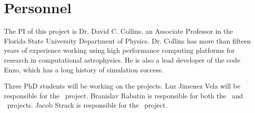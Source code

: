 
\section{Personnel}

The PI of this project is Dr. David C. Collins, an Associate Professor in the
Florida State University Department of Physics.  Dr. Collins has more than
fifteen years of experience working using high performance computing platforms
for research  in computational astrophysics.   He is also a
lead developer of the code Enzo, which has a long history of simulation
success.

Three PhD students will be working on the projects.  Luz Jimenez Vela will
be responsible for the \nameCores\ project.  Branislav Rabatin is responsible
for both the \nameTurbulence\ and \nameCMB\ projects.  Jacob Strack is
responsible for the \nameGalaxies\ project.  


